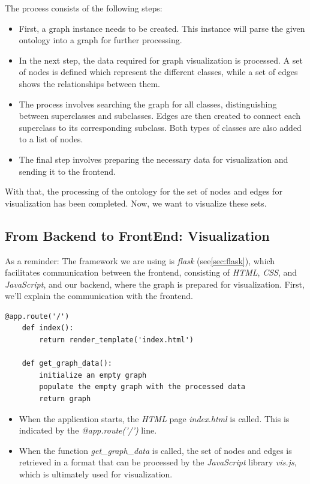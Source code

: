 The process consists of the following steps:
\begin{itemize}
    \item First, a graph instance needs to be created. This instance will parse the given ontology into a graph for further processing.
    \item In the next step, the data required for graph visualization is processed. A set of nodes is defined which represent the different classes, while a set of edges shows the relationships between them.
    \item The process involves searching the graph for all classes, distinguishing between superclasses and subclasses. Edges are then created to connect each superclass to its corresponding subclass. Both types of classes are also added to a list of nodes.
    \item The final step involves preparing the necessary data for visualization and sending it to the frontend.
\end{itemize}

With that, the processing of the ontology for the set of nodes and edges for visualization has been completed. Now, we want to visualize these sets.

\subsection{From Backend to FrontEnd: Visualization}

As a reminder: The framework we are using is \textit{flask} (see\ref{sec:flask}), which facilitates communication between the frontend, consisting of \textit{HTML}, \textit{CSS}, and \textit{JavaScript}, 
and our backend, where the graph is prepared for visualization. First, we'll explain the communication with the frontend.

\begin{lstlisting}[caption={Backend preparing data},captionpos=b]
    @app.route('/')
    def index():
        return render_template('index.html')
    
    def get_graph_data():
        initialize an empty graph
        populate the empty graph with the processed data
        return graph

\end{lstlisting}
    
\begin{itemize}
    \item When the application starts, the \textit{HTML} page \textit{index.html} is called. This is indicated by the \textit{@app.route('/')} line.
    \item When the function \textit{get\_graph\_data} is called, the set of nodes and edges is retrieved in a format that can be processed by the \textit{JavaScript} library \textit{vis.js}, which is ultimately used for visualization.
\end{itemize}

